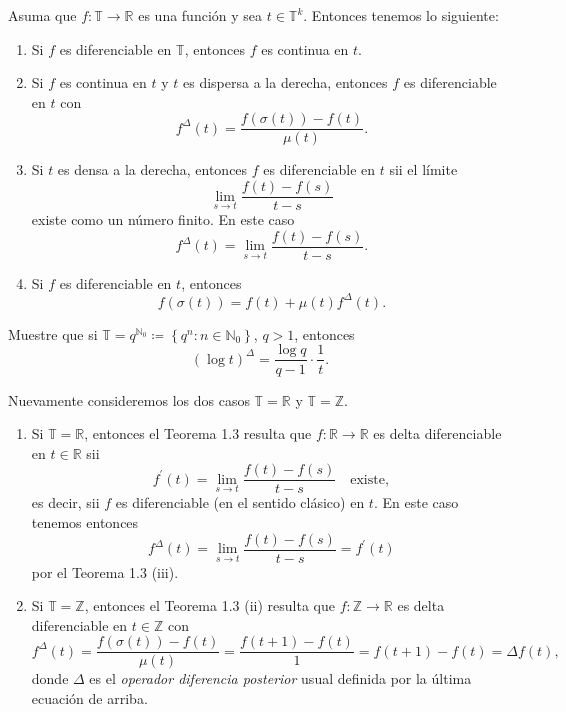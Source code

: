 \begin{theorem}{}
	Asuma que $f\colon\mathds{T}\rightarrow\mathds{R}$ es una función y sea $t\in\mathds{T}^{k}$. Entonces tenemos lo siguiente:
	\begin{enumerate}
		\item Si $f$ es diferenciable en $\mathds{T}$, entonces $f$ es continua en $t$.
		\item Si $f$ es continua en $t$ y $t$ es dispersa a la derecha, entonces $f$ es diferenciable en $t$ con \[ f^{\Delta}(t)=\frac{f(\sigma(t))-f(t)}{\mu(t)}. \]
		\item Si $t$ es densa a la derecha, entonces $f$ es diferenciable en $t$ sii el límite \[ \lim_{s\to t}\frac{f(t)-f(s)}{t-s} \] existe como un número finito. En este caso \[ f^{\Delta}(t)=\lim_{s\to t}\frac{f(t)-f(s)}{t-s}. \]
		\item Si $f$ es diferenciable en $t$, entonces \[ f(\sigma(t))=f(t)+\mu(t)f^{\Delta}(t). \]
	\end{enumerate}
\end{theorem}
\begin{exercise}
	Muestre que si $\mathds{T}=q^{\mathds{N}_{0}}\coloneqq\left\{q^{n}:n\in\mathds{N}_{0}\right\}$, $q>1$, entonces \[ {\left(\log t\right)}^{\Delta}=\frac{\log q}{q-1}\cdot\frac{1}{t}. \]
\end{exercise}
\begin{example}{}
	Nuevamente consideremos los dos casos $\mathds{T}=\mathds{R}$ y $\mathds{T}=\mathds{Z}$.
	\begin{enumerate}
		\item Si $\mathds{T}=\mathds{R}$, entonces el Teorema 1.3 resulta que $f\colon\mathds{R}\rightarrow\mathds{R}$ es delta diferenciable en $t\in\mathds{R}$ sii \[ f^{\prime}(t)=\lim_{s\to t}\frac{f(t)-f(s)}{t-s}\quad\text{existe}, \] es decir, sii $f$ es diferenciable (en el sentido clásico) en $t$. En este caso tenemos entonces \[ f^{\Delta}(t)=\lim_{s\to t}\frac{f(t)-f(s)}{t-s}=f^{\prime}(t) \] por el Teorema 1.3 (iii).
		\item Si $\mathds{T}=\mathds{Z}$, entonces el Teorema 1.3 (ii) resulta que $f\colon\mathds{Z}\rightarrow\mathds{R}$ es delta diferenciable en $t\in\mathds{Z}$ con \[ f^{\Delta}(t)=\frac{f(\sigma(t))-f(t)}{\mu(t)}=\frac{f(t+1)-f(t)}{1}=f(t+1)-f(t)=\Delta f(t), \] donde $\Delta$ es el \emph{operador diferencia posterior} usual definida por la última ecuación de arriba.
	\end{enumerate}
\end{example}

